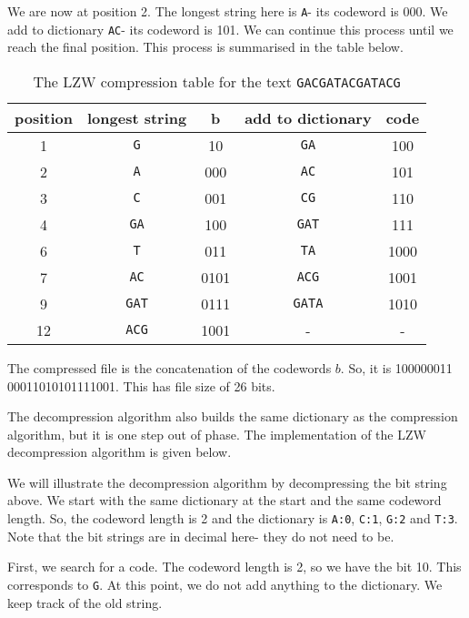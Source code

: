 \documentclass[a4paper, openany]{memoir}
\begin{document}
We are now at position 2. The longest string here is \texttt{A}- its codeword is 000. We add to dictionary \texttt{AC}- its codeword is 101. We can continue this process until we reach the final position. This process is summarised in the table below.
\begin{table}[H]
    \centering
    \begin{tabular}{|c|c|c|c|c|}
        \hline
        position & longest string & b & add to dictionary & code \\
        \hline
        1 & \texttt{G} & 10 & \texttt{GA} & 100 \\
        \hline
        2 & \texttt{A} & 000 & \texttt{AC} & 101 \\
        \hline
        3 & \texttt{C} & 001 & \texttt{CG} & 110 \\
        \hline
        4 & \texttt{GA} & 100 & \texttt{GAT} & 111 \\
        \hline
        6 & \texttt{T} & 011 & \texttt{TA} & 1000 \\
        \hline
        7 & \texttt{AC} & 0101 & \texttt{ACG} & 1001 \\
        \hline
        9 & \texttt{GAT} & 0111 & \texttt{GATA} & 1010 \\
        \hline
        12 & \texttt{ACG} & 1001 & - & - \\
        \hline
    \end{tabular}
    \caption{The LZW compression table for the text \texttt{GACGATACGATACG}}
\end{table}
\noindent The compressed file is the concatenation of the codewords $b$. So, it is 100000011 00011010101111001. This has file size of 26 bits.

The decompression algorithm also builds the same dictionary as the compression algorithm, but it is one step out of phase. The implementation of the LZW decompression algorithm is given below.

We will illustrate the decompression algorithm by decompressing the bit string above. We start with the same dictionary at the start and the same codeword length. So, the codeword length is 2 and the dictionary is \texttt{A:0}, \texttt{C:1}, \texttt{G:2} and \texttt{T:3}. Note that the bit strings are in decimal here- they do not need to be.

First, we search for a code. The codeword length is 2, so we have the bit 10. This corresponds to \texttt{G}. At this point, we do not add anything to the dictionary. We keep track of the old string. 
\end{document}
